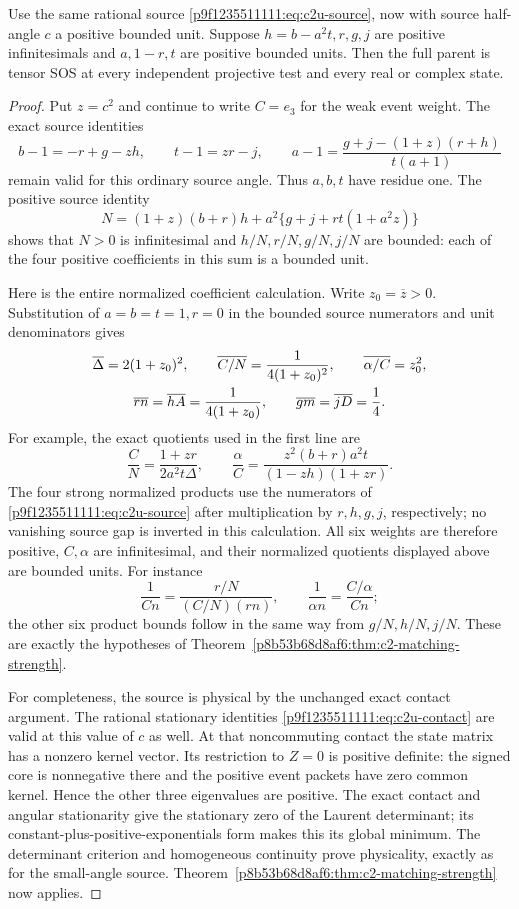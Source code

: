 \begin{corollary}
\label{p8b53b68d8af6:cor:c2-ordinary-angle-radial}
Use the same rational source \eqref{p9f1235511111:eq:c2u-source}, now with source
half-angle $c$ a positive bounded unit.  Suppose $h=b-a^2t,r,g,j$ are
positive infinitesimals and $a,1-r,t$ are positive bounded units.
Then the full parent is tensor SOS at every independent projective test
and every real or complex state.
\end{corollary}
\begin{proof}
Put $z=c^2$ and continue to write $C=e_3$ for the weak event weight.
The exact source identities
\[
 b-1=-r+g-zh,\qquad t-1=zr-j,\qquad
 a-1=\frac{g+j-(1+z)(r+h)}{t(a+1)}
\]
remain valid for this ordinary source angle.  Thus $a,b,t$ have residue
one.  The positive source identity
\[
 N=(1+z)(b+r)h+a^2\{g+j+rt(1+a^2z)\}
\]
shows that $N>0$ is infinitesimal and $h/N,r/N,g/N,j/N$ are bounded:
each of the four positive coefficients in this sum is a bounded unit.

Here is the entire normalized coefficient calculation.  Write
$z_0=\overline z>0$.  Substitution of $a=b=t=1,r=0$ in the bounded
source numerators and unit denominators gives
\begin{gather}
 \overline\Delta=2(1+z_0)^2,\qquad
 \overline{C/N}=\frac1{4(1+z_0)^2},\qquad
 \overline{\alpha/C}=z_0^2,\notag\\
 \overline{rn}=\overline{hA}=\frac1{4(1+z_0)},\qquad
 \overline{gm}=\overline{jD}=\frac14.
\label{p8b53b68d8af6:eq:c2ms-ordinary-residues}
\end{gather}
For example, the exact quotients used in the first line are
\[
 \frac CN=\frac{1+zr}{2a^2t\Delta},\qquad
 \frac\alpha C=\frac{z^2(b+r)a^2t}{(1-zh)(1+zr)}.
\]
The four strong normalized products use the numerators of
\eqref{p9f1235511111:eq:c2u-source} after multiplication by $r,h,g,j$, respectively;
no vanishing source gap is inverted in this calculation.
All six weights are therefore positive, $C,\alpha$ are infinitesimal,
and their normalized quotients displayed above are bounded units.
For instance
\[
 \frac1{Cn}=\frac{r/N}{(C/N)(rn)},\qquad
 \frac1{\alpha n}=\frac{C/\alpha}{Cn};
\]
the other six product bounds follow in the same way from $g/N,h/N,j/N$.
These are exactly the hypotheses of Theorem~\ref{p8b53b68d8af6:thm:c2-matching-strength}.

For completeness, the source is physical by the unchanged exact contact
argument.  The rational stationary identities
\eqref{p9f1235511111:eq:c2u-contact} are valid at this value of $c$ as well.
At that noncommuting contact the state matrix has a nonzero kernel
vector.  Its restriction to $Z=0$ is positive definite: the signed core
is nonnegative there and the positive event packets have zero common
kernel.  Hence the other three eigenvalues are positive.  The exact
contact and angular stationarity give the stationary zero of the
Laurent determinant; its constant-plus-positive-exponentials form makes
this its global minimum.  The determinant criterion and homogeneous
continuity prove physicality, exactly as for the small-angle source.
Theorem~\ref{p8b53b68d8af6:thm:c2-matching-strength} now applies.


\end{proof}
